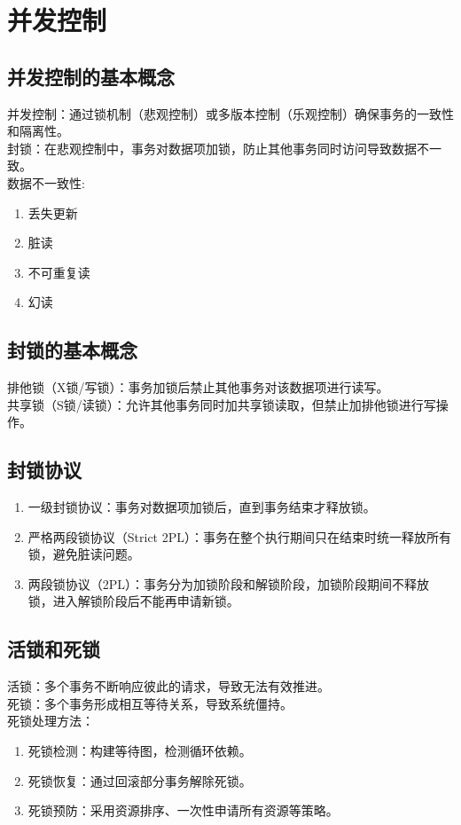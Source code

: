 \section{并发控制}
\subsection{并发控制的基本概念}
并发控制：通过锁机制（悲观控制）或多版本控制（乐观控制）确保事务的一致性和隔离性。\\
封锁：在悲观控制中，事务对数据项加锁，防止其他事务同时访问导致数据不一致。\\
数据不一致性:
\begin{enumerate}
    \item 丢失更新
    \item 脏读
    \item 不可重复读
    \item 幻读
\end{enumerate}
\subsection{封锁的基本概念}
排他锁（X锁/写锁）：事务加锁后禁止其他事务对该数据项进行读写。\\
共享锁（S锁/读锁）：允许其他事务同时加共享锁读取，但禁止加排他锁进行写操作。\\

\subsection{封锁协议}
\begin{enumerate}
    \item 一级封锁协议：事务对数据项加锁后，直到事务结束才释放锁。
    \item 严格两段锁协议（Strict 2PL）：事务在整个执行期间只在结束时统一释放所有锁，避免脏读问题。
    \item 两段锁协议（2PL）：事务分为加锁阶段和解锁阶段，加锁阶段期间不释放锁，进入解锁阶段后不能再申请新锁。
\end{enumerate}
\subsection{活锁和死锁}
活锁：多个事务不断响应彼此的请求，导致无法有效推进。\\
死锁：多个事务形成相互等待关系，导致系统僵持。\\
死锁处理方法：
\begin{enumerate}
    \item 死锁检测：构建等待图，检测循环依赖。
    \item 死锁恢复：通过回滚部分事务解除死锁。
    \item 死锁预防：采用资源排序、一次性申请所有资源等策略。
\end{enumerate}
